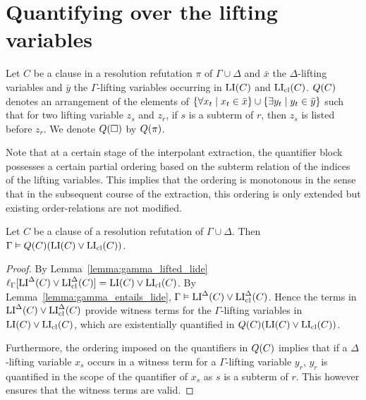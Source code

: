 \documentclass[,%
	draft=false,%
	numbers=noendperiod
	11pt,
	a4paper,
	oneside,%
	openany,
]{memoir}
\begin{document}
\section{Quantifying over the lifting variables}

\begin{defi}
	\label{def:arrow_quantifier_block}
	Let $C$ be a clause in a resolution refutation $\pi$ of $\Gamma\cup\Delta$
	and $\bar x$ the $\Delta$-lifting variables and $\bar y$ the $\Gamma$-lifting variables occurring in $\operatorname{LI}(C)$ and $\operatorname{LI}_{\operatorname{cl}}(C)$.
	$Q(C)$ denotes an arrangement of the elements of  $\{ \forall x_t \mid\nolinebreak x_t \in \bar x\} \cup \{ \exists y_t \mid y_t \in \bar y\}$ such that for two lifting variable $z_s$ and $z_r$, if $s$ is a subterm of $r$, then $z_s$ is listed before $z_r$.
	We denote $Q(\square)$ by $Q(\pi)$.
\end{defi}

Note that at a certain stage of the interpolant extraction, the quantifier block possesses a certain partial ordering based on the subterm relation of the indices of the lifting variables.
This implies that the ordering is monotonous in the sense that in the subsequent course of the extraction, this ordering is only extended but existing order-relations are not modified.


\begin{lemma}
	\label{lemma:gamma_entails_quantified_lide}
	Let $C$ be a clause of a resolution refutation of $\Gamma\cup\Delta$. Then
	$\Gamma\vDash Q(C)(\operatorname{LI}(C) \lor \operatorname{LI}_{\operatorname{cl}}(C))$.
\end{lemma}
\begin{proof}
	By Lemma~\ref{lemma:gamma_lifted_lide}
	$\ell_{\Gamma}[ \operatorname{LI}^\Delta(C) \lor \operatorname{LI}_{\operatorname{cl}}^\Delta(C)] = \operatorname{LI}(C) \lor \operatorname{LI}_{\operatorname{cl}}(C)$.
	By Lemma~\ref{lemma:gamma_entails_lide},
	$\Gamma\vDash \operatorname{LI}^\Delta(C) \lor \operatorname{LI}_{\operatorname{cl}}^\Delta(C)$. 
	Hence the terms in $\operatorname{LI}^\Delta(C) \lor \operatorname{LI}_{\operatorname{cl}}^\Delta(C)$ provide witness terms for the $\Gamma$-lifting variables in $\operatorname{LI}(C) \lor \operatorname{LI}_{\operatorname{cl}}(C)$, which are existentially quantified in $Q(C) (\operatorname{LI}(C) \lor \operatorname{LI}_{\operatorname{cl}}(C))$.

	Furthermore, the ordering imposed on the quantifiers in $Q(C)$ implies that if a $\Delta$-lifting variable $x_s$ occurs in a witness term for a $\Gamma$-lifting variable $y_r$, $y_r$ is quantified in the scope of the quantifier of $x_s$ as $s$ is a subterm of $r$.
	This however ensures that the witness terms are valid.
\end{proof}
\end{document}
